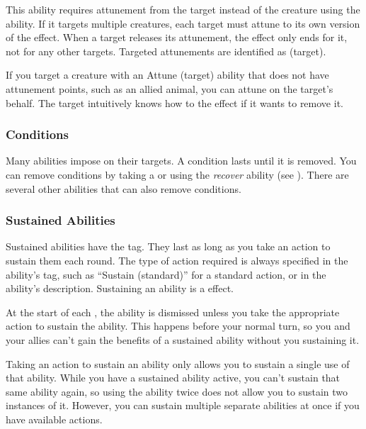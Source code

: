        This ability requires attunement from the target instead of the creature using the ability.
      If it targets multiple creatures, each target must attune to its own version of the effect.
      When a target releases its attunement, the effect only ends for it, not for any other targets.
      Targeted attunements are identified as  (target).

      If you target a creature with an Attune (target) ability that does not have attunement points, such as an allied animal, you can attune on the target's behalf.
      The target intuitively knows how to  the effect if it wants to remove it.

    \subsubsection{Conditions}\label{Conditions}
      Many abilities impose  on their targets.
      A condition lasts until it is removed.
      You can remove conditions by taking a  or using the \textit{recover} ability (see ).
      There are several other abilities that can also remove conditions.

    \subsubsection{Sustained Abilities}\label{Sustained Abilities}
      Sustained abilities have the  tag.
      They last as long as you take an action to sustain them each round.
      The type of action required is always specified in the ability's tag, such as ``Sustain (standard)'' for a standard action, or in the ability's description.
      Sustaining an ability is a \atSwift effect.

      At the start of each , the ability is dismissed unless you take the appropriate action to sustain the ability.
      This happens before your normal turn, so you and your allies can't gain the benefits of a sustained ability without you sustaining it.

      Taking an action to sustain an ability only allows you to sustain a single use of that ability.
      While you have a sustained ability active, you can't sustain that same ability again, so using the ability twice does not allow you to sustain two instances of it.
      However, you can sustain multiple separate abilities at once if you have available actions.

